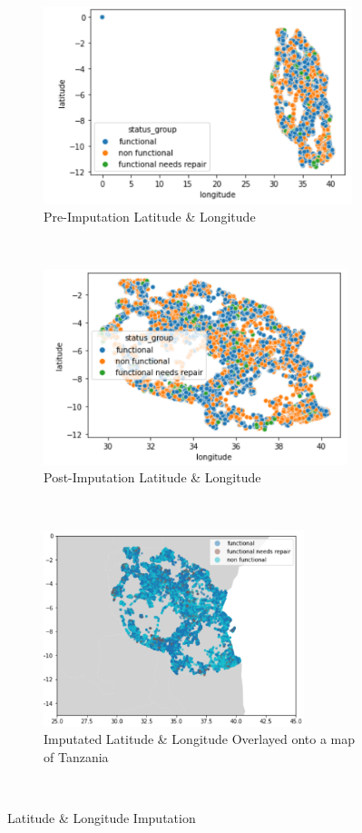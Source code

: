 \documentclass[conference]{IEEEtran}
\begin{document}
\begin{figure}[t!]
  \centering
  \begin{subfigure}[t]{0.5\textwidth}
      \centering
      \includegraphics[height=2.25in]{figures/tom_impute_lat_1}
      \caption{Pre-Imputation Latitude \& Longitude}
  \end{subfigure}%
  ~
  \begin{subfigure}[t]{0.5\textwidth}
      \centering
      \includegraphics[height=2.25in]{figures/tom_impute_lat_2}
      \caption{Post-Imputation Latitude \& Longitude}
  \end{subfigure}
  ~
  \begin{subfigure}[t]{0.5\textwidth}
      \centering
      \includegraphics[height=2.25in]{figures/tom_impute_lat_3}
      \caption{Imputated Latitude \& Longitude Overlayed onto a map of Tanzania}
  \end{subfigure}
  ~
  \caption{Latitude \& Longitude Imputation}
  \label{fig:lat_long_imputation}
\end{figure}
\end{document}
